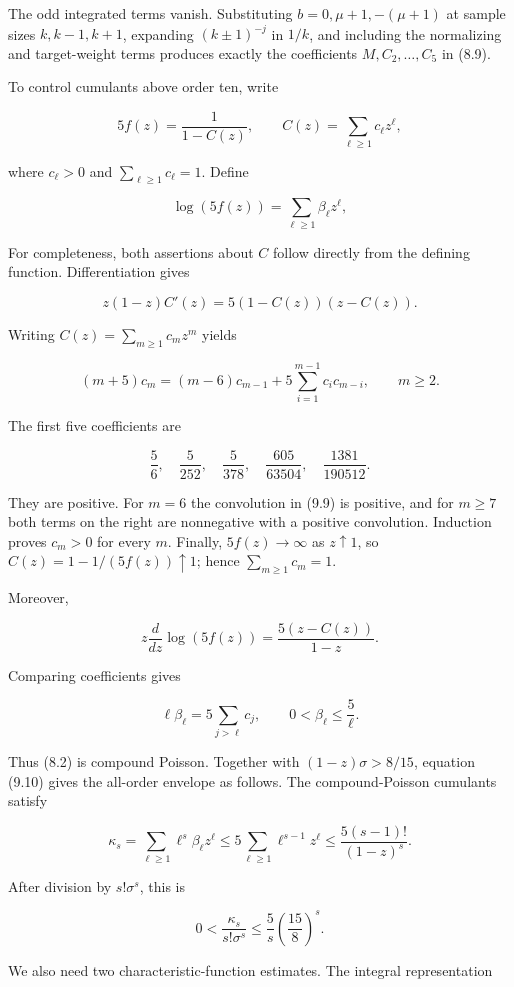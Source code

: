 \documentclass[11pt]{article}
\numberwithin{equation}{section}
\begin{document}
The odd integrated terms vanish. Substituting $b=0,\mu+1,-(\mu+1)$ at sample sizes
$k,k-1,k+1$, expanding $(k\pm1)^{-j}$ in $1/k$, and including the normalizing and
target-weight terms produces exactly the coefficients $M,C_2,\ldots,C_5$ in (8.9).

To control cumulants above order ten, write

\[
5f(z)=\frac1{1-C(z)},
\qquad
C(z)=\sum_{\ell\ge1}c_\ell z^\ell,
\]

where $c_\ell>0$ and $\sum_{\ell\ge1}c_\ell=1$. Define

\[
\log(5f(z))=\sum_{\ell\ge1}\beta_\ell z^\ell,
\]

For completeness, both assertions about $C$ follow directly from the defining function.
Differentiation gives

\[
z(1-z)C'(z)=5(1-C(z))(z-C(z)).
\]

Writing $C(z)=\sum_{m\ge1}c_mz^m$ yields

\[
(m+5)c_m=(m-6)c_{m-1}
+5\sum_{i=1}^{m-1}c_ic_{m-i},
\qquad m\ge2.
\tag{9.9}
\]

The first five coefficients are

\[
\frac56,\quad \frac5{252},\quad \frac5{378},\quad
\frac{605}{63504},\quad \frac{1381}{190512}.
\]

They are positive. For $m=6$ the convolution in (9.9) is positive, and for $m\ge7$
both terms on the right are nonnegative with a positive convolution. Induction proves
$c_m>0$ for every $m$. Finally, $5f(z)\to\infty$ as $z\uparrow1$, so
$C(z)=1-1/(5f(z))\uparrow1$; hence $\sum_{m\ge1}c_m=1$.

Moreover,

\[
z\frac{d}{dz}\log(5f(z))=\frac{5(z-C(z))}{1-z}.
\]

Comparing coefficients gives

\[
\ell\beta_\ell=5\sum_{j>\ell}c_j,
\qquad
0<\beta_\ell\le\frac5\ell.
\tag{9.10}
\]

Thus (8.2) is compound Poisson. Together with $(1-z)\sigma>8/15$, equation (9.10)
gives the all-order envelope as follows. The compound-Poisson cumulants satisfy

\[
\kappa_s=\sum_{\ell\ge1}\ell^s\beta_\ell z^\ell
\le5\sum_{\ell\ge1}\ell^{s-1}z^\ell
\le\frac{5(s-1)!}{(1-z)^s}.
\]

After division by $s!\sigma^s$, this is

\[
0<\frac{\kappa_s}{s!\sigma^s}
\le\frac5s\left(\frac{15}{8}\right)^s.
\tag{9.11}
\]

We also need two characteristic-function estimates. The integral representation
\end{document}
